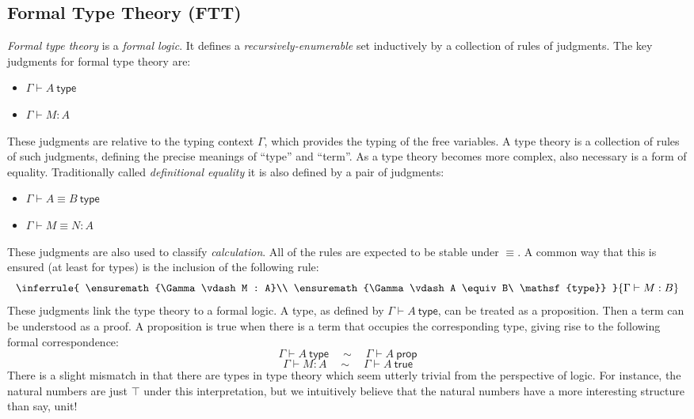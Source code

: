 \documentclass{article}
\newcommand{\hasTF}[2]{\ensuremath{#1 \vdash #2\ \mathsf{type}}}
\newcommand{\hasEF}[3]{\ensuremath{#1 \vdash #2 : #3}}
\newcommand{\hasTEF}[3]{\ensuremath{#1 \vdash #2 \equiv #3\ \mathsf{type}}}
\newcommand{\hasEEF}[4]{\ensuremath{#1 \vdash #2 \equiv #3 : #4}}
\begin{document}
\subsection{Formal Type Theory (FTT)}
\emph{Formal type theory} is a \emph{formal logic}. It defines a
\emph{recursively-enumerable} set inductively by a collection of rules of
judgments. The key judgments for formal type theory are:
\begin{itemize}
\item $\hasTF{\Gamma}{A}$
\item $\hasEF{\Gamma}{M}{A}$
\end{itemize}
These judgments are relative to the typing context $\Gamma$, which provides the typing of the
free variables.  A type theory is a collection of rules of such judgments, defining the
precise meanings of ``type'' and ``term''. As a type theory becomes more complex, also
necessary is a form of equality. Traditionally called \emph{definitional equality} it is also
defined by a pair of judgments:
\begin{itemize}
\item $\hasTEF{\Gamma}{A}{B}$
\item $\hasEEF{\Gamma}{M}{N}{A}$
\end{itemize}
These judgments are also used to classify \emph{calculation}. All of
the rules are expected to be stable under $\equiv$. A common way that
this is ensured (at least for types) is the inclusion of the following
rule:
\[
  \inferrule{
    \hasEF{\Gamma}{M}{A}\\
    \hasTEF{\Gamma}{A}{B}
  }{\hasEF{\Gamma}{M}{B}}
\]
These judgments link the type theory to a formal logic. A type, as
defined by $\hasTF{\Gamma}{A}$, can be treated as a proposition. Then
a term can be understood as a proof. A proposition is true when there
is a term that occupies the corresponding type, giving rise to the following formal correspondence:
\[
\hasTF{\Gamma}{A} \quad \sim \quad \ensuremath{\Gamma \vdash A\ \mathsf{prop}}\]
\[\hasEF{\Gamma}{M}{A} \quad \sim \quad \ensuremath{\Gamma \vdash A\ \mathsf{true}}
\]
There is a slight
mismatch in that there are types in type theory which seem utterly
trivial from the perspective of logic. For instance, the natural
numbers are just $\top$ under this interpretation, but we intuitively
believe that the natural numbers have a more interesting structure
than say, unit!
\end{document}
